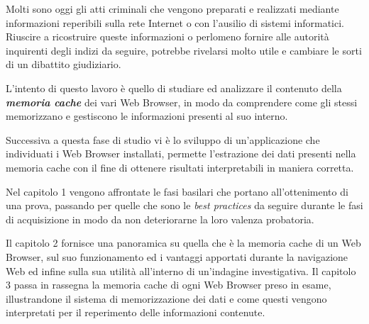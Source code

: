 Molti sono oggi gli atti criminali che vengono preparati e realizzati mediante informazioni reperibili sulla rete Internet o con l'ausilio di sistemi informatici. Riuscire a ricostruire queste informazioni o perlomeno fornire alle autorità inquirenti degli indizi da seguire, potrebbe rivelarsi molto utile e cambiare le sorti di un dibattito giudiziario.

L'intento di questo lavoro è quello di studiare ed analizzare il contenuto della \textbf{\textit{memoria cache}} dei vari Web Browser, in modo da comprendere come gli stessi memorizzano e gestiscono le informazioni presenti al suo interno. 

Successiva a questa fase di studio vi è lo sviluppo di un'applicazione che individuati i Web Browser installati, permette l'estrazione dei dati presenti nella memoria cache con il fine di ottenere risultati interpretabili in maniera corretta.

Nel capitolo 1 vengono affrontate le fasi basilari che portano all'ottenimento di una prova, passando per quelle che sono le \textit{best practices} da seguire durante le fasi di acquisizione in modo da non deteriorarne la loro valenza probatoria. 

Il capitolo 2 fornisce una panoramica su quella che è la memoria cache di un Web Browser, sul suo funzionamento ed i vantaggi apportati durante la navigazione Web ed infine sulla sua utilità all'interno di un'indagine investigativa. 
\clearpage
Il capitolo 3 passa in rassegna la memoria cache di ogni Web Browser preso in esame, illustrandone il sistema di memorizzazione dei dati e come questi vengono interpretati per il reperimento delle informazioni contenute.